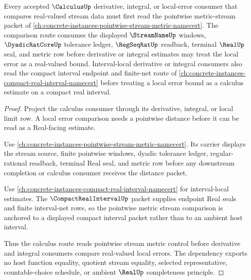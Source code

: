 \begin{theorem}
\label{thm:calculus-pointwise-stream-metric-dependency-route}
Every accepted $\CalculusUp$ derivative, integral, or local-error consumer that compares real-valued stream data must first read the pointwise metric-stream packet of \autoref{ch:concrete-instances-pointwise-stream-metric-namecert}. The comparison route consumes the displayed $\StreamNameUp$ windows, $\DyadicRatCoreUp$ tolerance ledger, $\RegSeqRatUp$ readback, terminal $\RealUp$ seal, and metric row before derivative or integral estimates may treat the local error as a real-valued bound.
Interval-local derivative or integral consumers also read the compact interval endpoint and finite-net route of \autoref{ch:concrete-instances-compact-real-interval-namecert} before treating a local error bound as a calculus estimate on a compact real interval.
\end{theorem}
\begin{proof}
Project the calculus consumer through its derivative, integral, or local limit row. A local error comparison needs a pointwise distance before it can be read as a Real-facing estimate.

Use \autoref{ch:concrete-instances-pointwise-stream-metric-namecert}. Its carrier displays the stream source, finite pointwise windows, dyadic tolerance ledger, regular-rational readback, terminal Real seal, and metric row before any downstream completion or calculus consumer receives the distance packet.

Use \autoref{ch:concrete-instances-compact-real-interval-namecert} for interval-local estimates. The $\CompactRealIntervalUp$ packet supplies endpoint Real seals and finite interval-net rows, so the pointwise metric stream comparison is anchored to a displayed compact interval packet rather than to an ambient host interval.

Thus the calculus route reads pointwise stream metric control before derivative and integral consumers compare real-valued local errors. The dependency exports no host function equality, quotient stream equality, selected representative, countable-choice schedule, or ambient $\RealUp$ completeness principle.
\end{proof}
